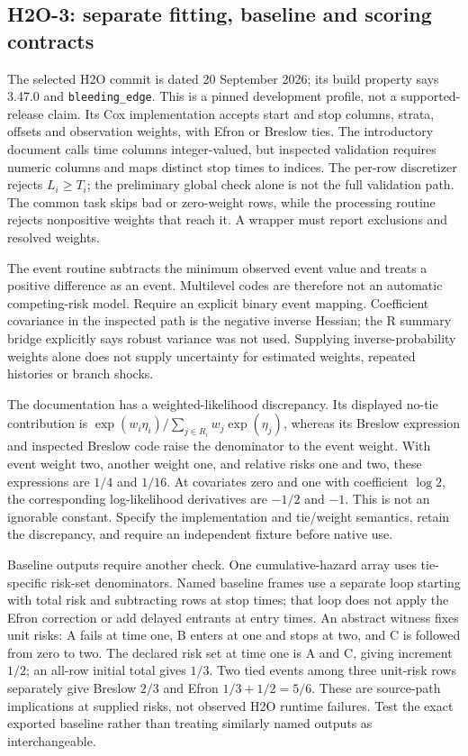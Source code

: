 \subsection{H2O-3: separate fitting, baseline and scoring contracts}
The selected H2O commit is dated 20 September 2026; its build property says
3.47.0 and \texttt{bleeding\_edge}. This is a pinned development profile,
not a supported-release claim. Its Cox implementation accepts start and stop
columns, strata, offsets and observation weights, with Efron or Breslow ties.
The introductory document calls time columns integer-valued, but inspected
validation requires numeric columns and maps distinct stop times to indices.
The per-row discretizer rejects $L_i\geq T_i$; the preliminary global check
alone is not the full validation path. The common task skips bad or
zero-weight rows, while the processing routine rejects nonpositive weights
that reach it. A wrapper must report exclusions and resolved weights.
\citep{exec24_longjava_h2o}

The event routine subtracts the minimum observed event value and treats a
positive difference as an event. Multilevel codes are therefore not an
automatic competing-risk model. Require an explicit binary event mapping.
Coefficient covariance in the inspected path is the negative inverse Hessian;
the R summary bridge explicitly says robust variance was not used. Supplying
inverse-probability weights alone does not supply uncertainty for estimated
weights, repeated histories or branch shocks. \citep{exec24_longjava_h2o}

The documentation has a weighted-likelihood discrepancy. Its displayed
no-tie contribution is $\exp(w_i\eta_i)/\sum_{j\in R_i}w_j\exp(\eta_j)$,
whereas its Breslow expression and inspected Breslow code raise the denominator
to the event weight. With event weight two, another weight one, and relative
risks one and two, these expressions are $1/4$ and $1/16$. At covariates zero
and one with coefficient $\log 2$, the corresponding log-likelihood
derivatives are $-1/2$ and $-1$. This is not an ignorable constant.
Specify the implementation and tie/weight semantics, retain the discrepancy,
and require an independent fixture before native use.
\citep{exec24_longjava_h2o,exec24_longjava_reference}

Baseline outputs require another check. One cumulative-hazard array uses
tie-specific risk-set denominators. Named baseline frames use a separate loop
starting with total risk and subtracting rows at stop times; that loop does
not apply the Efron correction or add delayed entrants at entry times.
An abstract witness fixes unit risks: A fails at time one, B enters at one
and stops at two, and C is followed from zero to two. The declared risk set
at time one is A and C, giving increment $1/2$; an all-row initial total gives
$1/3$. Two tied events among three unit-risk rows separately give Breslow
$2/3$ and Efron $1/3+1/2=5/6$. These are source-path implications at
supplied risks, not observed H2O runtime failures. Test the exact exported
baseline rather than treating similarly named outputs as interchangeable.
\citep{exec24_longjava_h2o,exec24_longjava_reference}

